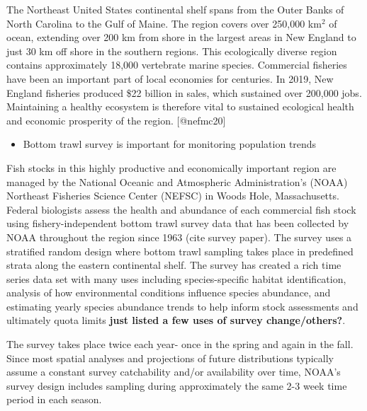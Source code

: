 \documentclass[
]{article}
\providecommand{\tightlist}{%
  \setlength{\itemsep}{0pt}\setlength{\parskip}{0pt}}
\begin{document}
The Northeast United States continental shelf spans from the Outer Banks of North Carolina to the Gulf of Maine. The region covers over 250,000 km\(^2\) of ocean, extending over 200 km from shore in the largest areas in New England to just 30 km off shore in the southern regions. This ecologically diverse region contains approximately 18,000 vertebrate marine species. Commercial fisheries have been an important part of local economies for centuries. In 2019, New England fisheries produced \$22 billion in sales, which sustained over 200,000 jobs. Maintaining a healthy ecosystem is therefore vital to sustained ecological health and economic prosperity of the region. {[}@nefmc20{]}

\begin{itemize}
\tightlist
\item
  Bottom trawl survey is important for monitoring population trends
\end{itemize}

Fish stocks in this highly productive and economically important region are managed by the National Oceanic and Atmospheric Administration's (NOAA) Northeast Fisheries Science Center (NEFSC) in Woods Hole, Massachusetts. Federal biologists assess the health and abundance of each commercial fish stock using fishery-independent bottom trawl survey data that has been collected by NOAA throughout the region since 1963 (cite survey paper). The survey uses a stratified random design where bottom trawl sampling takes place in predefined strata along the eastern continental shelf. The survey has created a rich time series data set with many uses including species-specific habitat identification, analysis of how environmental conditions influence species abundance, and estimating yearly species abundance trends to help inform stock assessments and ultimately quota limits \textbf{just listed a few uses of survey change/others?}.

The survey takes place twice each year- once in the spring and again in the fall. Since most spatial analyses and projections of future distributions typically assume a constant survey catchability and/or availability over time, NOAA's survey design includes sampling during approximately the same 2-3 week time period in each season.
\end{document}
